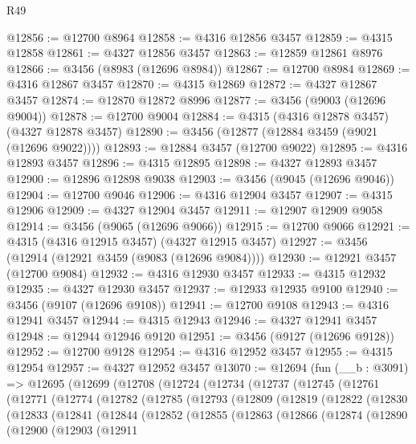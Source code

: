 \begin{lexlean}{R49}
\begin{coremodule}
@12856 := @12700 @8964
@12858 := @4316 @12856 @3457
@12859 := @4315 @12858
@12861 := @4327 @12856 @3457
@12863 := @12859 @12861 @8976
@12866 := @3456 (@8983 (@12696 @8984))
@12867 := @12700 @8984
@12869 := @4316 @12867 @3457
@12870 := @4315 @12869
@12872 := @4327 @12867 @3457
@12874 := @12870 @12872 @8996
@12877 := @3456 (@9003 (@12696 @9004))
@12878 := @12700 @9004
@12884 := @4315 (@4316 @12878 @3457) (@4327 @12878 @3457)
@12890 := @3456 (@12877 (@12884 @3459 (@9021 (@12696 @9022))))
@12893 := @12884 @3457 (@12700 @9022)
@12895 := @4316 @12893 @3457
@12896 := @4315 @12895
@12898 := @4327 @12893 @3457
@12900 := @12896 @12898 @9038
@12903 := @3456 (@9045 (@12696 @9046))
@12904 := @12700 @9046
@12906 := @4316 @12904 @3457
@12907 := @4315 @12906
@12909 := @4327 @12904 @3457
@12911 := @12907 @12909 @9058
@12914 := @3456 (@9065 (@12696 @9066))
@12915 := @12700 @9066
@12921 := @4315 (@4316 @12915 @3457) (@4327 @12915 @3457)
@12927 := @3456 (@12914 (@12921 @3459 (@9083 (@12696 @9084))))
@12930 := @12921 @3457 (@12700 @9084)
@12932 := @4316 @12930 @3457
@12933 := @4315 @12932
@12935 := @4327 @12930 @3457
@12937 := @12933 @12935 @9100
@12940 := @3456 (@9107 (@12696 @9108))
@12941 := @12700 @9108
@12943 := @4316 @12941 @3457
@12944 := @4315 @12943
@12946 := @4327 @12941 @3457
@12948 := @12944 @12946 @9120
@12951 := @3456 (@9127 (@12696 @9128))
@12952 := @12700 @9128
@12954 := @4316 @12952 @3457
@12955 := @4315 @12954
@12957 := @4327 @12952 @3457
@13070 := @12694
    (fun (__b : @3091) =>
    @12695
      (@12699
        (@12708
          (@12724
            (@12734
              (@12737
                (@12745
                  (@12761
                    (@12771
                      (@12774
                        (@12782
                          (@12785
                            (@12793
                              (@12809
                                (@12819
                                  (@12822
                                    (@12830
                                      (@12833
                                        (@12841
                                          (@12844
                                            (@12852
                                              (@12855
                                                (@12863
                                                  (@12866
                                                    (@12874
                                                      (@12890
                                                        (@12900
                                                          (@12903
                                                            (@12911

\end{coremodule}
\end{lexlean}
